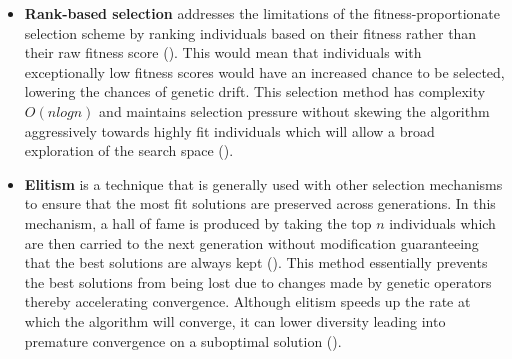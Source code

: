 \begin{itemize}
	\item \textbf{Rank-based selection} addresses the limitations of the fitness-proportionate selection scheme by ranking individuals based on their fitness rather than their raw fitness score (\cite{mitchell1998introduction}). This would mean that individuals with exceptionally low fitness scores would have an increased chance to be selected, lowering the chances of genetic drift. This selection method has complexity $O(n log n)$ and maintains selection pressure without skewing the algorithm aggressively towards highly fit individuals which will allow a broad exploration of the search space (\cite{mitchell1998introduction}). \bigskip
	
	\item \textbf{Elitism} is a technique that is generally used with other selection mechanisms to ensure that the most fit solutions are preserved across generations. In this mechanism, a hall of fame is produced by taking the top $n$ individuals which are then carried to the next generation without modification guaranteeing that the best solutions are always kept (\cite{mitchell1998introduction}). This method essentially prevents the best solutions from being lost due to changes made by genetic operators thereby accelerating convergence. Although elitism speeds up the rate at which the algorithm will converge, it can lower diversity leading into premature convergence on a suboptimal solution (\cite{malik2014preventing}). \bigskip
	

\end{itemize}
